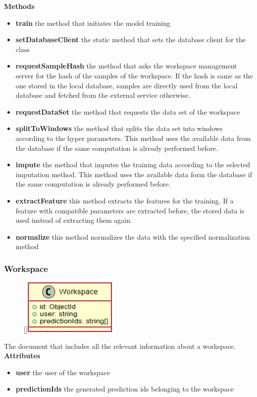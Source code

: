 \textbf{Methods}
\begin{itemize}
    \item \textbf{train} the method that initiates the model training
    \item \textbf{setDatabaseClient} the static method that sets the database client for the class
    \item \textbf{requestSampleHash} the method that asks the workspace management server for the hash of the samples of the workspace. If the hash is same as the one stored in the local database, samples are directly used from the local database and fetched from the external service otherwise.
    \item \textbf{requestDataSet} the method that requests the data set of the workspace
    \item \textbf{splitToWindows} the method that splits the data set into windows according to the hyper parameters. This method uses the available data from the database if the same computation is already performed before.
    \item \textbf{impute} the method that imputes the training data according to the selected imputation method. This method uses the available data form the database if the same computation is already performed before.
    \item \textbf{extractFeature} this method extracts the features for the training. If a feature with compatible parameters are extracted before, the stored data is used instead of extracting them again.
    \item \textbf{normalize} this method normalizes the data with the specified normalization method
\end{itemize}

\subsubsection{Workspace}
\label{mm-Workspace}
\begin{figure}
    \raisebox{0pt}[\dimexpr{}\baselineskip\relax]{\includegraphics[width=4.5cm]{classes/model-management/2.png}}
\end{figure} 
\par
The document that includes all the relevant information about a workspace.
\newline
\newline
\textbf{Attributes}
\begin{itemize}
    \item \textbf{user} the user of the workspace
    \item \textbf{predictionIds} the generated prediction ids belonging to the workspace
\end{itemize}

